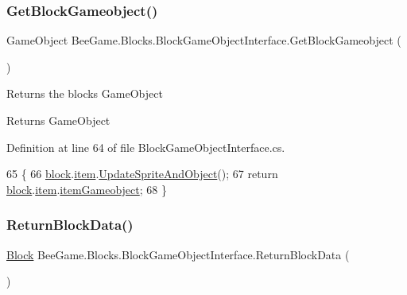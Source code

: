 \subsubsection{\texorpdfstring{Get\+Block\+Gameobject()}{GetBlockGameobject()}}
{\footnotesize\ttfamily Game\+Object Bee\+Game.\+Blocks.\+Block\+Game\+Object\+Interface.\+Get\+Block\+Gameobject (\begin{DoxyParamCaption}{ }\end{DoxyParamCaption})}



Returns the blocks Game\+Object 

\begin{DoxyReturn}{Returns}
Game\+Object
\end{DoxyReturn}


Definition at line 64 of file Block\+Game\+Object\+Interface.\+cs.


\begin{DoxyCode}
65         \{
66             \hyperlink{class_bee_game_1_1_blocks_1_1_block_game_object_interface_a238bad3b956ec84c8b1cc3127948b75d}{block}.\hyperlink{class_bee_game_1_1_blocks_1_1_block_addc8d61c8acab21b0f15df5fed804f11}{item}.\hyperlink{struct_bee_game_1_1_items_1_1_item_a29abdb5010a23262e7562720bb85c171}{UpdateSpriteAndObject}();
67             \textcolor{keywordflow}{return} \hyperlink{class_bee_game_1_1_blocks_1_1_block_game_object_interface_a238bad3b956ec84c8b1cc3127948b75d}{block}.\hyperlink{class_bee_game_1_1_blocks_1_1_block_addc8d61c8acab21b0f15df5fed804f11}{item}.\hyperlink{struct_bee_game_1_1_items_1_1_item_af28a8cd4a0eff9d4c18189c5ab525f18}{itemGameobject};
68         \}
\end{DoxyCode}
\mbox{\label{class_bee_game_1_1_blocks_1_1_block_game_object_interface_a40b044d5bf2a857ea25796685e23f768}} 
\subsubsection{\texorpdfstring{Return\+Block\+Data()}{ReturnBlockData()}}
{\footnotesize\ttfamily \hyperlink{class_bee_game_1_1_blocks_1_1_block}{Block} Bee\+Game.\+Blocks.\+Block\+Game\+Object\+Interface.\+Return\+Block\+Data (\begin{DoxyParamCaption}{ }\end{DoxyParamCaption})}



